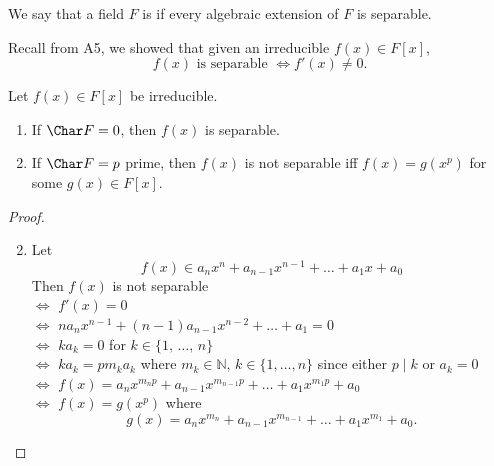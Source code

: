 \documentclass[notoc,notitlepage,nobib]{tufte-book}
\begin{document}
\begin{defn}\label{defn:perfect_fields}
  We say that a field $F$ is  if every algebraic extension of
  $F$ is separable.
\end{defn}

\begin{note}
  Recall from A5, we showed that given an irreducible $f(x) \in F[x]$,
  \begin{equation*}
    f(x) \text{ is separable } \iff f'(x) \neq 0.
  \end{equation*}
\end{note}

\begin{propo}\label{propo:separability_and_the_characteristic_of_a_field}
  Let $f(x) \in F[x]$ be irreducible.
  \begin{enumerate}
    \item If $\Char F = 0$, then $f(x)$ is separable. 
    \item If $\Char F = p$ prime, then $f(x)$ is not separable iff $f(x) = g(x^p)$
      for some $g(x) \in F[x]$.
  \end{enumerate}
\end{propo}

\begin{proof}
  \begin{enumerate}
    \setcounter{enumi}{1}
    \item Let
      \begin{equation*}
        f(x) \in a_n x^n + a_{n - 1} x^{n - 1} + \hdots + a_1 x + a_0
      \end{equation*}
      Then $f(x)$ is not separable \\
      $\iff$ $f'(x) = 0$ \\
      $\iff$ $na_n x^{n - 1} + (n - 1)a_{n - 1} x^{n - 2} + \hdots + a_1 = 0$
        \\
      $\iff$ $ka_k = 0$ for $k \in \{ 1, \, \ldots, \, n \}$ \\
      $\iff$ $ka_k = pm_k a_k$ where $m_k \in \mathbb{N}$, $k \in \{ 1, \ldots,
        n \}$ since either $p \mid k$ or $a_k = 0$ \\
      $\iff$ $f(x) = a_n x^{m_n p} + a_{n - 1}x^{m_{n - 1} p} + \hdots + a_1
        x^{m_1 p} + a_0$ \\
      $\iff$ $f(x) = g(x^p)$ where
      \begin{equation*}
        g(x) = a_n x^{m_n} + a_{n - 1} x^{m_{n - 1}} + \hdots + a_1 x^{m_1} +
        a_0.
      \end{equation*}
  \end{enumerate}
\end{proof}
\end{document}
